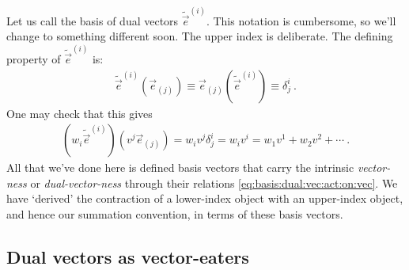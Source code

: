 Let us call the basis of dual vectors $\tilde{\vec{e}}^{(i)}$. This notation is cumbersome, so we’ll change to something different soon. The upper index is deliberate. The defining property of $\tilde{\vec{e}}^{(i)}$ is:
\begin{align}
  \tilde{\vec{e}}^{(i)}\left(\vec{e}_{(j)}\right) 
  \equiv 
  \vec{e}_{(j)}\left(\tilde{\vec{e}}^{(i)}\right) 
  \equiv
  \delta^i_j \ .
  \label{eq:basis:dual:vec:act:on:vec}
\end{align}
One may check that this gives
\begin{align}
  \left(w_i\tilde{\vec{e}}^{(i)}\right)\left(v^j\vec{e}_{(j)}\right)
  = w_i v^j \delta^i_j = w_i v^i = w_1 v^1 + w_2 v^2 + \cdots \ .
  \label{eq:oneform:eats:vector:basis}
\end{align}
All that we've done here is defined basis vectors that carry the intrinsic \emph{vector-ness} or \emph{dual-vector-ness} through their relations \eqref{eq:basis:dual:vec:act:on:vec}. We have `derived' the contraction of a lower-index object with an upper-index object, and hence our summation convention, in terms of these basis vectors.

\subsection{Dual vectors as vector-eaters}

